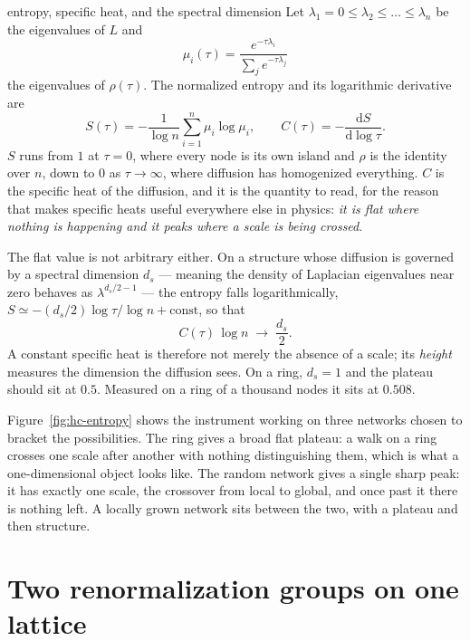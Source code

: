 \begin{calculation}{entropy, specific heat, and the spectral dimension}
Let $\lambda_1=0\le\lambda_2\le\dots\le\lambda_n$ be the eigenvalues of $L$ and
\begin{equation}
  \mu_i(\tau) = \frac{e^{-\tau\lambda_i}}{\sum_j e^{-\tau\lambda_j}}
  \label{eq:hc-mu}
\end{equation}
the eigenvalues of $\rho(\tau)$. The normalized entropy and its logarithmic
derivative are
\begin{equation}
  S(\tau) = -\frac{1}{\log n}\sum_{i=1}^{n}\mu_i\log\mu_i,
  \qquad
  C(\tau) = -\frac{\mathrm{d}S}{\mathrm{d}\log\tau} .
  \label{eq:hc-SC}
\end{equation}
$S$ runs from $1$ at $\tau=0$, where every node is its own island and $\rho$ is the
identity over $n$, down to $0$ as $\tau\to\infty$, where diffusion has homogenized
everything. $C$ is the specific heat of the diffusion, and it is the quantity to
read, for the reason that makes specific heats useful everywhere else in physics:
\emph{it is flat where nothing is happening and it peaks where a scale is being
crossed}.

The flat value is not arbitrary either. On a structure whose diffusion is governed
by a spectral dimension $d_s$ --- meaning the density of Laplacian eigenvalues near
zero behaves as $\lambda^{d_s/2-1}$ --- the entropy falls logarithmically,
$S \simeq -(d_s/2)\log\tau/\log n + \text{const}$, so that
\begin{equation}
  C(\tau)\,\log n \;\longrightarrow\; \frac{d_s}{2} .
  \label{eq:hc-plateau}
\end{equation}
A constant specific heat is therefore not merely the absence of a scale; its
\emph{height} measures the dimension the diffusion sees. On a ring, $d_s=1$ and the
plateau should sit at $0.5$. Measured on a ring of a thousand nodes it sits at
$0.508$.
\end{calculation}

Figure~\ref{fig:hc-entropy} shows the instrument working on three networks chosen to
bracket the possibilities. The ring gives a broad flat plateau: a walk on a ring
crosses one scale after another with nothing distinguishing them, which is what a
one-dimensional object looks like. The random network gives a single sharp peak: it
has exactly one scale, the crossover from local to global, and once past it there is
nothing left. A locally grown network sits between the two, with a plateau and then
structure.


\section{Two renormalization groups on one lattice}
\label{sec:hc-rg}

